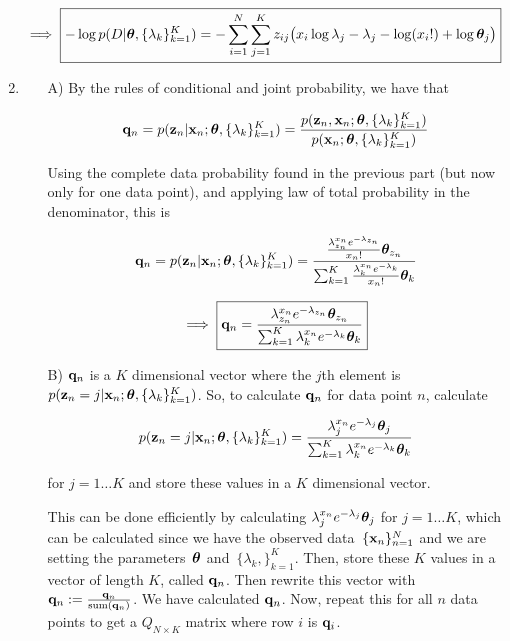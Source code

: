 \documentclass[submit]{harvardml}
\begin{document}
\begin{enumerate}
$$ \implies \boxed{ -\log p(D | \boldsymbol{\theta}, \{\lambda_k\}^K_{k=1})  = - \sum_{i=1}^N \sum_{j=1}^K z_{ij} \big(x_i\log\lambda_{j} -\lambda_{j} - \log(x_i!) + \log\boldsymbol{\theta}_{j} \big)} $$

\item 
\begin{enumerate}
\item[A)] By the rules of conditional and joint probability, we have that

$$\mathbf{q}_n = p(\mathbf{z}_n | \mathbf{x}_n; \boldsymbol{\theta}, \{ \lambda_k \}^K_{k=1}) = \frac{p(\mathbf{z}_n, \mathbf{x}_n; \boldsymbol{\theta}, \{ \lambda_k \}^K_{k=1})}{p(\mathbf{x}_n; \boldsymbol{\theta}, \{ \lambda_k \}^K_{k=1})} $$

Using the complete data probability found in the previous part (but now only for one data point), and applying law of total probability in the denominator, this is

$$\mathbf{q}_n = p(\mathbf{z}_n | \mathbf{x}_n; \boldsymbol{\theta}, \{ \lambda_k \}^K_{k=1}) = \frac{ \frac{\lambda_{z_n}^{x_n} e^{-\lambda_{z_n}}}{x_n!} \boldsymbol{\theta}_{z_n} }{ \sum_{k=1}^K \frac{\lambda_k^{x_n} e^{-\lambda_k}}{x_n!} \boldsymbol{\theta}_k}$$

$$ \implies \boxed{ \mathbf{q}_n = \frac{\lambda_{z_n}^{x_n} e^{-\lambda_{z_n}} \boldsymbol{\theta}_{z_n} }{ \sum_{k=1}^K \lambda_k^{x_n} e^{-\lambda_k} \boldsymbol{\theta}_k} }$$

\item[B)] $\mathbf{q}_n$ is a $K$ dimensional vector where the $j$th element is $p(\mathbf{z}_n = j| \mathbf{x}_n; \boldsymbol{\theta}, \{ \lambda_k \}^K_{k=1})$. So, to calculate $\mathbf{q}_n$ for data point $n$, calculate 

$$p(\mathbf{z}_n = j| \mathbf{x}_n; \boldsymbol{\theta}, \{ \lambda_k \}^K_{k=1}) = \frac{\lambda_{j}^{x_n} e^{-\lambda_{j}} \boldsymbol{\theta}_{j} }{ \sum_{k=1}^K \lambda_k^{x_n} e^{-\lambda_k} \boldsymbol{\theta}_k}  $$

for $j = 1 \dots K$ and store these values in a $K$ dimensional vector.

This can be done efficiently by calculating $\lambda_{j}^{x_n} e^{-\lambda_{j}} \boldsymbol{\theta}_{j}$ for $j = 1 \dots K$, which can be calculated since we have the observed data~$\{\mathbf{x}_n\}^N_{n=1}$ and we are setting the parameters~$\boldsymbol{\theta}$ and~$\{ \lambda_k,  \}^K_{k=1}$. Then, store these $K$ values in a vector of length $K$, called $\mathbf{q}_n$. Then rewrite this vector with $\mathbf{q}_n := \frac{\mathbf{q}_n}{\textrm{sum}(\mathbf{q}_n)} $. We have calculated $\mathbf{q}_n$. Now, repeat this for all $n$ data points to get a $Q_{N \times K}$ matrix where row $i$ is $\mathbf{q}_i$.

\end{enumerate}


\end{enumerate}
\end{document}
